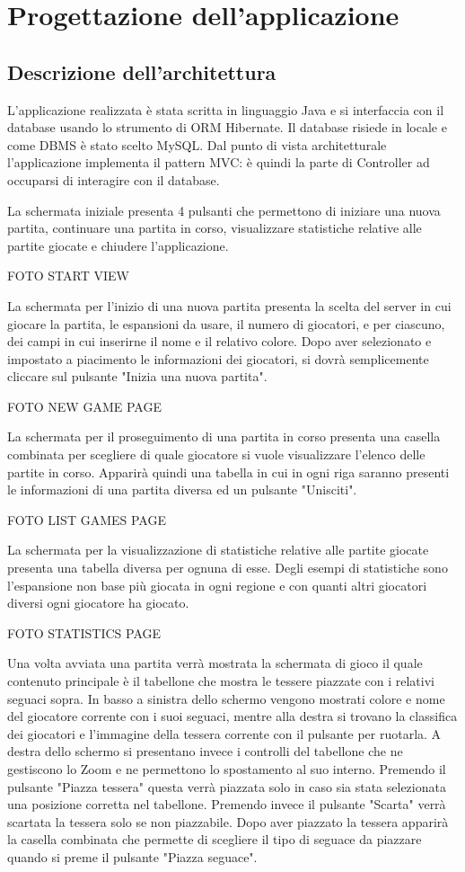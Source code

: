 \section{Progettazione dell'applicazione}
\subsection{Descrizione dell'architettura}
L'applicazione realizzata è stata scritta in linguaggio Java e si interfaccia con il database usando lo strumento di ORM Hibernate. Il database risiede in locale e come DBMS è stato scelto MySQL. Dal punto di vista architetturale l'applicazione implementa il pattern MVC: è quindi la parte di Controller ad occuparsi di interagire con il database.
\medskip

La schermata iniziale presenta 4 pulsanti che permettono di iniziare una nuova partita, continuare una partita in corso, visualizzare statistiche relative alle partite giocate e chiudere l'applicazione.

FOTO START VIEW

La schermata per l'inizio di una nuova partita presenta la scelta del server in cui giocare la partita, le espansioni da usare, il numero di giocatori, e per ciascuno, dei campi in cui inserirne il nome e il relativo colore. Dopo aver selezionato e impostato a piacimento le informazioni dei giocatori, si dovrà semplicemente cliccare sul pulsante "Inizia una nuova partita".

FOTO NEW GAME PAGE

La schermata per il proseguimento di una partita in corso presenta una casella combinata per scegliere di quale giocatore si vuole visualizzare l'elenco delle partite in corso. Apparirà quindi una tabella in cui in ogni riga saranno presenti le informazioni di una partita diversa ed un pulsante "Unisciti".

FOTO LIST GAMES PAGE

La schermata per la visualizzazione di statistiche relative alle partite giocate presenta una tabella diversa per ognuna di esse. Degli esempi di statistiche sono l'espansione non base più giocata in ogni regione e con quanti altri giocatori diversi ogni giocatore ha giocato.

FOTO STATISTICS PAGE

Una volta avviata una partita verrà mostrata la schermata di gioco il quale contenuto principale è il tabellone che mostra le tessere piazzate con i relativi seguaci sopra. In basso a sinistra dello schermo vengono mostrati colore e nome del giocatore corrente con i suoi seguaci, mentre alla destra si trovano la classifica dei giocatori e l'immagine della tessera corrente con il pulsante per ruotarla. A destra dello schermo si presentano invece i controlli del tabellone che ne gestiscono lo Zoom e ne permettono lo spostamento al suo interno. Premendo il pulsante "Piazza tessera" questa verrà piazzata solo in caso sia stata selezionata una posizione corretta nel tabellone. Premendo invece il pulsante "Scarta" verrà scartata la tessera solo se non piazzabile. Dopo aver piazzato la tessera apparirà la casella combinata che permette di scegliere il tipo di seguace da piazzare quando si preme il pulsante "Piazza seguace".

